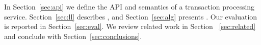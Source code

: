 In Section~\ref{sec:api} we define the  API and semantics of a transaction processing service. 
Section~\ref{sec:ll} describes \sysll, and 
Section~\ref{sec:alg} presents \sys.  Our evaluation is reported in 
Section~\ref{sec:eval}.
We review related work in Section ~\ref{sec:related} and conclude with Section~\ref{sec:conclusions}.
